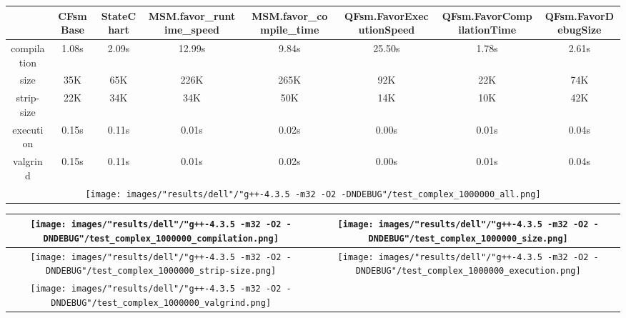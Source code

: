 \begin{landscape}
\begin{table}
\caption{"dell" [df6407d], g++-4.3.5 -m32 -O2 -DNDEBUG/test complex 1000000}
\centering
\begin{longtable}{| c | c |c |c |c |c |c |c |}
\hline
& CFsmBase& StateChart& MSM.favor\_runtime\_speed& MSM.favor\_compile\_time& QFsm.FavorExecutionSpeed& QFsm.FavorCompilationTime& QFsm.FavorDebugSize\\
\hline
compilation & 1.08s & 2.09s & 12.99s & 9.84s & 25.50s & 1.78s & 2.61s\\
\hline
size & 35K & 65K & 226K & 265K & 92K & 22K & 74K\\
\hline
strip-size & 22K & 34K & 34K & 50K & 14K & 10K & 42K\\
\hline
execution & 0.15s & 0.11s & 0.01s & 0.02s & 0.00s & 0.01s & 0.04s\\
\hline
valgrind & 0.15s & 0.11s & 0.01s & 0.02s & 0.00s & 0.01s & 0.04s\\
\hline
\multicolumn{8}{|c|}{\texttt{[image: images/"results/dell"/"g++-4.3.5 -m32 -O2 -DNDEBUG"/test\_complex\_1000000\_all.png]}}\\
\hline
\end{longtable}
\end{table}
\end{landscape}
\newpage
\begin{table}
\centering
\begin{longtable}{| c | c |}
\hline
\texttt{[image: images/"results/dell"/"g++-4.3.5 -m32 -O2 -DNDEBUG"/test\_complex\_1000000\_compilation.png]}& \texttt{[image: images/"results/dell"/"g++-4.3.5 -m32 -O2 -DNDEBUG"/test\_complex\_1000000\_size.png]}\\
\hline
\texttt{[image: images/"results/dell"/"g++-4.3.5 -m32 -O2 -DNDEBUG"/test\_complex\_1000000\_strip-size.png]}& \texttt{[image: images/"results/dell"/"g++-4.3.5 -m32 -O2 -DNDEBUG"/test\_complex\_1000000\_execution.png]}\\
\hline
\texttt{[image: images/"results/dell"/"g++-4.3.5 -m32 -O2 -DNDEBUG"/test\_complex\_1000000\_valgrind.png]}& \\ \hline
\end{longtable}
\end{table}
